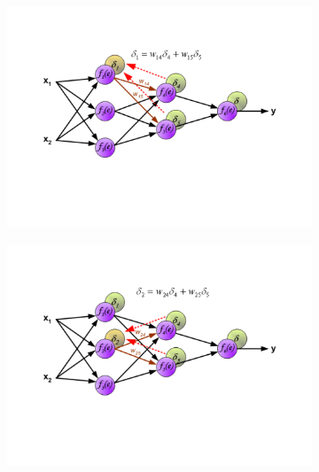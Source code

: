 \documentclass[a4paper,10pt]{article}
\begin{document}
\begin{figure}[h!]
\begin{subfigure}[b]{0.3\linewidth}
  \end{subfigure}
  \\
  \begin{subfigure}[b]{0.3\linewidth}
   \includegraphics[width=\linewidth]{BackPropd.png}
  \end{subfigure}
  \begin{subfigure}[b]{0.3\linewidth}
   \includegraphics[width=\linewidth]{BackPrope.png}
  \end{subfigure}
  \begin{subfigure}[b]{0.3 \linewidth}

\end{subfigure}
\end{figure}
\end{document}
